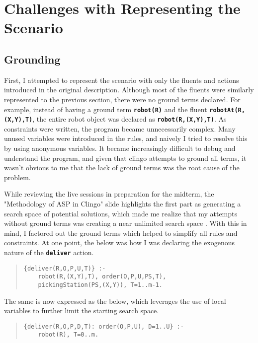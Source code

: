 \documentclass[letterpaper]{article}
\newcommand{\ct}[1]{\texttt{\textbf{#1}}}
\begin{document}
\section{Challenges with Representing the Scenario}

\subsection{Grounding}

First, I attempted to represent the scenario with only the fluents and actions introduced in the original description. Although most of the fluents were similarly represented to the previous section, there were no ground terms declared. For example, instead of having a ground term \ct{robot(R)} and the fluent \ct{robotAt(R,(X,Y),T)}, the entire robot object was declared as \ct{robot(R,(X,Y),T)}. As constraints were written, the program became unnecessarily complex. Many unused variables were introduced in the rules, and naively I tried to resolve this by using anonymous variables. It became increasingly difficult to debug and understand the program, and given that clingo attempts to ground all terms, it wasn't obvious to me that the lack of ground terms was the root cause of the problem.

While reviewing the live sessions in preparation for the midterm, the "Methodology of ASP in Clingo" slide highlights the first part as generating a search space of potential solutions, which made me realize that my attempts without ground terms was creating a near unlimited search space \cite{Altunkaya2023}. With this in mind, I factored out the ground terms which helped to simplify all rules and constraints. At one point, the below was how I was declaring the exogenous nature of the \ct{deliver} action.

\begin{quote}\begin{scriptsize}\begin{verbatim}
{deliver(R,O,P,U,T)} :-
    robot(R,(X,Y),T), order(O,P,U,PS,T),
    pickingStation(PS,(X,Y)), T=1..m-1.
\end{verbatim}\end{scriptsize}\end{quote}

The same is now expressed as the below, which leverages the use of local variables to further limit the starting search space.

\begin{quote}\begin{scriptsize}\begin{verbatim}
{deliver(R,O,P,D,T): order(O,P,U), D=1..U} :-
    robot(R), T=0..m.
\end{verbatim}\end{scriptsize}\end{quote}
\end{document}
